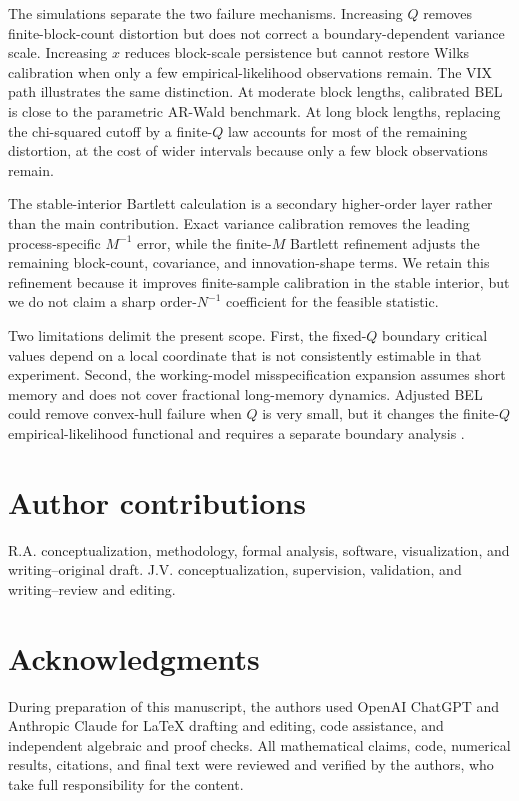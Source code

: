 \documentclass[12pt]{article}
\theoremstyle{remark}
\begin{document}
The simulations separate the two failure mechanisms. Increasing $Q$ removes finite-block-count distortion but does not correct a boundary-dependent variance scale. Increasing $x$ reduces block-scale persistence but cannot restore Wilks calibration when only a few empirical-likelihood observations remain. The VIX path illustrates the same distinction. At moderate block lengths, calibrated BEL is close to the parametric AR-Wald benchmark. At long block lengths, replacing the chi-squared cutoff by a finite-$Q$ law accounts for most of the remaining distortion, at the cost of wider intervals because only a few block observations remain.

The stable-interior Bartlett calculation is a secondary higher-order layer rather than the main contribution. Exact variance calibration removes the leading process-specific $M^{-1}$ error, while the finite-$M$ Bartlett refinement adjusts the remaining block-count, covariance, and innovation-shape terms. We retain this refinement because it improves finite-sample calibration in the stable interior, but we do not claim a sharp order-$N^{-1}$ coefficient for the feasible statistic.

Two limitations delimit the present scope. First, the fixed-$Q$ boundary critical values depend on a local coordinate that is not consistently estimable in that experiment. Second, the working-model misspecification expansion assumes short memory and does not cover fractional long-memory dynamics. Adjusted BEL could remove convex-hull failure when $Q$ is very small, but it changes the finite-$Q$ empirical-likelihood functional and requires a separate boundary analysis \citep{Wang.Polonik:2019}.

\section*{Author contributions}
R.A. conceptualization, methodology, formal analysis, software, visualization, and writing--original draft. J.V. conceptualization, supervision, validation, and writing--review and editing.

\section*{Acknowledgments}
During preparation of this manuscript, the authors used OpenAI ChatGPT and Anthropic Claude for LaTeX drafting and editing, code assistance, and independent algebraic and proof checks. All mathematical claims, code, numerical results, citations, and final text were reviewed and verified by the authors, who take full responsibility for the content.
\end{document}
